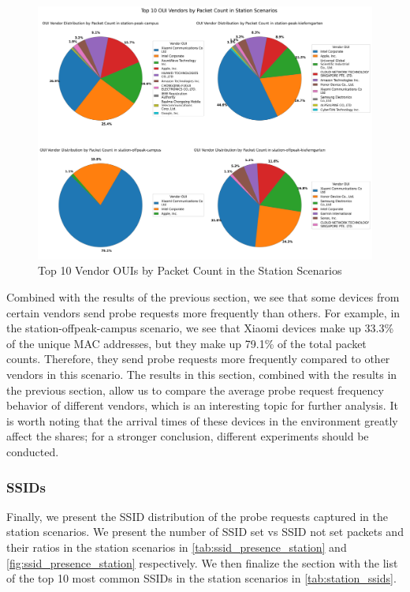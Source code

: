 \documentclass[sigconf,nonacm]{acmart}
\begin{document}
\begin{figure}
    \centering
    \includegraphics[width=\columnwidth]{images/part1/oui-vendors/station-scenarios-packet-count.png}
    \caption{Top 10 Vendor OUIs by Packet Count in the Station Scenarios}
    \label{tab:station_oui_packet_count}
\end{figure}

Combined with the results of the previous section, we see that some devices from certain vendors send probe requests more frequently than others. For example, in the station-offpeak-campus scenario, we see that Xiaomi devices make up 33.3\% of the unique MAC addresses, but they make up 79.1\% of the total packet counts. Therefore, they send probe requests more frequently compared to other vendors in this scenario. The results in this section, combined with the results in the previous section, allow us to compare the average probe request frequency behavior of different vendors, which is an interesting topic for further analysis. It is worth noting that the arrival times of these devices in the environment greatly affect the shares; for a stronger conclusion, different experiments should be conducted.

\subsubsection{SSIDs}
\label{sec:part-1/station/ssids}

Finally, we present the SSID distribution of the probe requests captured in the station scenarios. We present the number of SSID set vs SSID not set packets and their ratios in the station scenarios in \cref{tab:ssid_presence_station} and \cref{fig:ssid_presence_station} respectively. We then finalize the section with the list of the top 10 most common SSIDs in the station scenarios in \cref{tab:station_ssids}.
\end{document}
